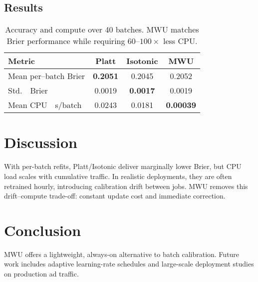 \documentclass[12pt, letterpaper]{article}
\begin{document}
\subsection{Results}
\begin{table}[H]
\centering
\begin{tabular}{@{}lccc@{}}
\toprule
Metric & Platt & Isotonic & \textbf{MWU}\\\midrule
Mean per--batch Brier & \textbf{0.2051} & 0.2045 & 0.2052\\
Std.~~Brier            & 0.0019 & \textbf{0.0017} & 0.0019\\
Mean CPU~~s/batch      & 0.0243 & 0.0181 & \textbf{0.00039}\\\bottomrule
\end{tabular}
\caption{Accuracy and compute over 40 batches. MWU matches Brier performance while requiring $60\text{--}100\times$ less CPU.}
\label{tab:main}
\end{table}

\section{Discussion}
With per-batch refits, Platt/Isotonic deliver marginally lower Brier, but CPU load scales with cumulative traffic.  In realistic deployments, they are often retrained hourly, introducing calibration drift between jobs.  MWU removes this drift--compute trade-off: constant update cost and immediate correction.

\section{Conclusion}
MWU offers a lightweight, always-on alternative to batch calibration.  Future work includes adaptive learning-rate schedules and large-scale deployment studies on production ad traffic.



\end{document}

